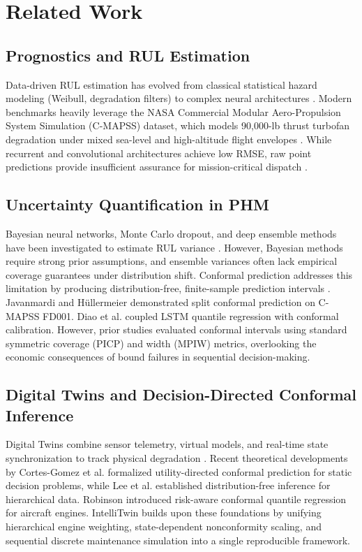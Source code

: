 \documentclass[conference]{IEEEtran}
\begin{document}
\section{Related Work}

\subsection{Prognostics and RUL Estimation}
Data-driven RUL estimation has evolved from classical statistical hazard modeling (Weibull, degradation filters) to complex neural architectures \cite{saxena2008damage}. Modern benchmarks heavily leverage the NASA Commercial Modular Aero-Propulsion System Simulation (C-MAPSS) dataset, which models 90,000-lb thrust turbofan degradation under mixed sea-level and high-altitude flight envelopes \cite{saxena2008damage, diao2026turbofan}. While recurrent and convolutional architectures achieve low RMSE, raw point predictions provide insufficient assurance for mission-critical dispatch \cite{wu2026research, belay2026digital}.

\subsection{Uncertainty Quantification in PHM}
Bayesian neural networks, Monte Carlo dropout, and deep ensemble methods have been investigated to estimate RUL variance \cite{chen2022data, xu2026novel}. However, Bayesian methods require strong prior assumptions, and ensemble variances often lack empirical coverage guarantees under distribution shift. Conformal prediction addresses this limitation by producing distribution-free, finite-sample prediction intervals \cite{javanmardi2023conformal}. Javanmardi and H\"ullermeier \cite{javanmardi2023conformal} demonstrated split conformal prediction on C-MAPSS FD001. Diao et al. \cite{diao2026turbofan} coupled LSTM quantile regression with conformal calibration. However, prior studies evaluated conformal intervals using standard symmetric coverage (PICP) and width (MPIW) metrics, overlooking the economic consequences of bound failures in sequential decision-making.

\subsection{Digital Twins and Decision-Directed Conformal Inference}
Digital Twins combine sensor telemetry, virtual models, and real-time state synchronization to track physical degradation \cite{huang2021survey, hasan2025new, pathri2025smart}. Recent theoretical developments by Cortes-Gomez et al. \cite{cortesgomez2025utility} formalized utility-directed conformal prediction for static decision problems, while Lee et al. \cite{lee2023hierarchical} established distribution-free inference for hierarchical data. Robinson \cite{robinson2026riskaware} introduced risk-aware conformal quantile regression for aircraft engines. IntelliTwin builds upon these foundations by unifying hierarchical engine weighting, state-dependent nonconformity scaling, and sequential discrete maintenance simulation into a single reproducible framework.
\end{document}
